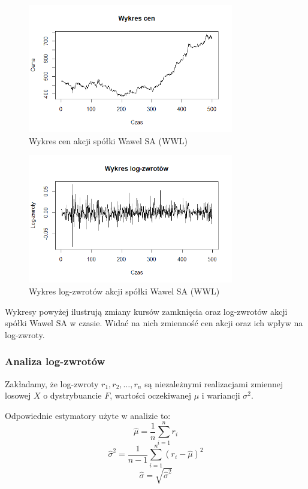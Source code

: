 \documentclass[a4paper,11pt]{article}
\begin{document}
\begin{figure}[H]
    \centering
    \includegraphics[width=0.8\textwidth]{./Wojtek/wykres-cen.png}
    \caption{Wykres cen akcji spółki Wawel SA (WWL)}
    \label{fig:wykres_cen}
\end{figure}

\begin{figure}[H]
    \centering
    \includegraphics[width=0.8\textwidth]{./Wojtek/wykres-log-zwrotow.png}
    \caption{Wykres log-zwrotów akcji spółki Wawel SA (WWL)}
    \label{fig:wykres_log_zwrotow}
\end{figure}

Wykresy powyżej ilustrują zmiany kursów zamknięcia oraz log-zwrotów akcji spółki Wawel SA w czasie. Widać na nich zmienność cen akcji oraz ich wpływ na log-zwroty.

\subsubsection{Analiza log-zwrotów}
Zakładamy, że log-zwroty $r_1, r_2, \ldots, r_n$ są niezależnymi realizacjami zmiennej losowej $X$ o dystrybuancie $F$, wartości oczekiwanej $\mu$ i wariancji $\sigma^2$. 

Odpowiednie estymatory użyte w analizie to:
\begin{equation}
    \hat{\mu} = \frac{1}{n} \sum_{i=1}^{n} r_i
\end{equation}
\begin{equation}
    \hat{\sigma}^2 = \frac{1}{n-1} \sum_{i=1}^{n} (r_i - \hat{\mu})^2
\end{equation}
\begin{equation}
    \hat{\sigma} = \sqrt{\hat{\sigma}^2}
\end{equation}
\end{document}
